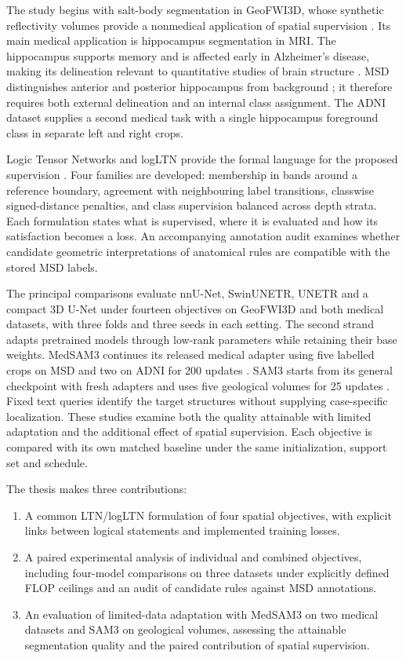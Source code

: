 \documentclass[12pt,a4paper]{article}
\begin{document}
The study begins with salt-body segmentation in GeoFWI3D, whose synthetic
reflectivity volumes provide a nonmedical application of spatial
supervision \cite{swaminadhan2026geofwi3d}. Its main medical application
is hippocampus segmentation in MRI. The hippocampus supports memory and
is affected early in Alzheimer's disease, making its delineation relevant
to quantitative studies of brain structure \cite{niaAlzheimerBrain}.
MSD distinguishes anterior and posterior hippocampus from background
\cite{simpson2019dataset}; it therefore requires both external delineation
and an internal class assignment. The ADNI dataset supplies
a second medical task with a single hippocampus foreground class in
separate left and right crops.

Logic Tensor Networks and logLTN provide the formal language for the
proposed supervision \cite{badreddine2022logic,badreddine2023logltn}.
Four families are developed: membership in bands around a reference
boundary, agreement with neighbouring label transitions, classwise
signed-distance penalties, and class supervision balanced across depth
strata. Each formulation states what is supervised, where it is evaluated
and how its satisfaction becomes a loss. An accompanying annotation audit
examines whether candidate geometric interpretations of anatomical rules
are compatible with the stored MSD labels.

The principal comparisons evaluate nnU-Net, SwinUNETR, UNETR and a compact
3D U-Net under fourteen objectives on GeoFWI3D and both medical datasets,
with three folds and three seeds in each setting. The second strand
adapts pretrained models through low-rank parameters while retaining
their base weights. MedSAM3 continues its released medical adapter using
five labelled crops on MSD and two on ADNI for 200 updates
\cite{liu2025medsam3}. SAM3 starts from its general checkpoint with fresh
adapters and uses five geological volumes for 25 updates
\cite{carion2025sam3}. Fixed text queries identify the target structures
without supplying case-specific localization. These studies examine both
the quality attainable with limited adaptation and the additional effect
of spatial supervision. Each objective is compared with its own matched
baseline under the same initialization, support set and schedule.

The thesis makes three contributions:
\begin{enumerate}
\item A common LTN/logLTN formulation of four spatial objectives, with
explicit links between logical statements and implemented training losses.
\item A paired experimental analysis of individual and combined objectives,
including four-model comparisons on three datasets under explicitly
defined FLOP ceilings and an audit of candidate rules against MSD annotations.
\item An evaluation of limited-data adaptation with MedSAM3 on two medical
datasets and SAM3 on geological volumes, assessing the attainable
segmentation quality and the paired contribution of spatial supervision.
\end{enumerate}
\end{document}
